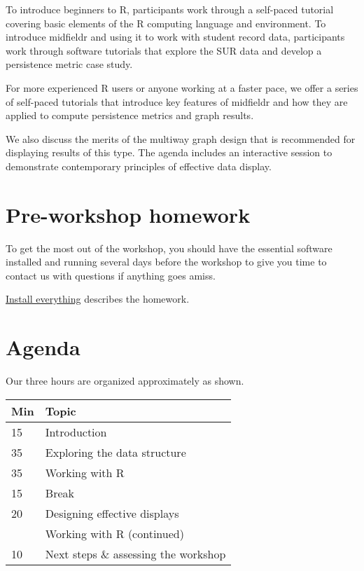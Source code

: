 \documentclass[
]{book}
\begin{document}
To introduce beginners to R, participants work through a self-paced tutorial covering basic elements of the R computing language and environment. To introduce midfieldr and using it to work with student record data, participants work through software tutorials that explore the SUR data and develop a persistence metric case study.

For more experienced R users or anyone working at a faster pace, we offer a series of self-paced tutorials that introduce key features of midfieldr and how they are applied to compute persistence metrics and graph results.

We also discuss the merits of the multiway graph design that is recommended for displaying results of this type. The agenda includes an interactive session to demonstrate contemporary principles of effective data display.

\hypertarget{pre-workshop-homework}{%
\section{Pre-workshop homework}\label{pre-workshop-homework}}

To get the most out of the workshop, you should have the essential software installed and running several days before the workshop to give you time to contact us with questions if anything goes amiss.

\protect\hyperlink{install-everything}{Install everything} describes the homework.

\hypertarget{agenda}{%
\section{Agenda}\label{agenda}}

Our three hours are organized approximately as shown.

\begin{tabular}{ll}
\toprule
Min & Topic\\
\midrule
15 & Introduction\\
35 & Exploring the data structure\\
35 & Working with R\\
15 & Break\\
20 & Designing effective displays\\
\addlinespace
50 & Working with R (continued)\\
10 & Next steps \& assessing the workshop\\
\bottomrule
\end{tabular}
\end{document}
